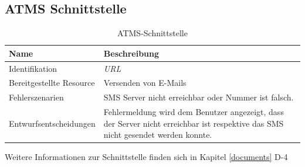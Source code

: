 \subsection{ATMS Schnittstelle}

\begin{table}[H]
	\centering
	\caption{ATMS-Schnittstelle}
	\begin{tabular}{ | p{4cm} | p{11cm} | }
		\toprule
		{\textbf{Name}} & {\textbf{Beschreibung}} \\
		\midrule
		Identifikation & \textit{\gls{URL}} \\ \hline
		Bereitgestellte Resource & Versenden von E-Mails\\ \hline
		Fehlerszenarien & SMS Server nicht erreichbar oder Nummer ist falsch.\\ \hline
		Entwurfsentscheidungen & Fehlermeldung wird dem Benutzer angezeigt, dass der Server nicht erreichbar ist respektive das SMS nicht gesendet werden konnte.\\
		\bottomrule
	\end{tabular}
\end{table}

Weitere Informationen zur Schnittstelle finden sich in Kapitel \ref{documents} D-4
